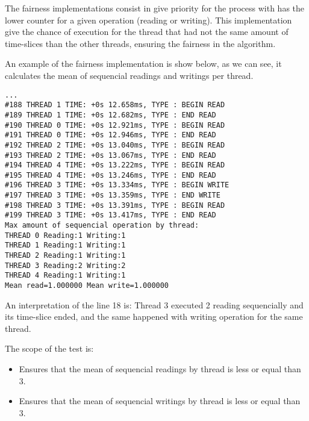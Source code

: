 \documentclass{article}
\begin{document}
	The fairness implementations consist in give priority for the process with has 
	the lower counter for a given operation (reading or writing). This implementation 
	give the chance of execution for the thread that had not the same amount of time-slices than 
	the other threads, ensuring the fairness in the algorithm.
	
	An example of the fairness implementation is show below, as we can see, it calculates
	the mean of sequencial readings and writings per thread. 

\begin{lstlisting}
...
#188 THREAD 1 TIME: +0s 12.658ms, TYPE : BEGIN READ 
#189 THREAD 1 TIME: +0s 12.682ms, TYPE : END READ 
#190 THREAD 0 TIME: +0s 12.921ms, TYPE : BEGIN READ 
#191 THREAD 0 TIME: +0s 12.946ms, TYPE : END READ 
#192 THREAD 2 TIME: +0s 13.040ms, TYPE : BEGIN READ 
#193 THREAD 2 TIME: +0s 13.067ms, TYPE : END READ 
#194 THREAD 4 TIME: +0s 13.222ms, TYPE : BEGIN READ 
#195 THREAD 4 TIME: +0s 13.246ms, TYPE : END READ 
#196 THREAD 3 TIME: +0s 13.334ms, TYPE : BEGIN WRITE 
#197 THREAD 3 TIME: +0s 13.359ms, TYPE : END WRITE 
#198 THREAD 3 TIME: +0s 13.391ms, TYPE : BEGIN READ 
#199 THREAD 3 TIME: +0s 13.417ms, TYPE : END READ 
Max amount of sequencial operation by thread:
THREAD 0 Reading:1 Writing:1
THREAD 1 Reading:1 Writing:1
THREAD 2 Reading:1 Writing:1
THREAD 3 Reading:2 Writing:2
THREAD 4 Reading:1 Writing:1
Mean read=1.000000 Mean write=1.000000
\end{lstlisting}

		An interpretation of the line 18 is: Thread 3 executed 2 reading sequencially and 
		its time-slice ended, and the same happened with writing operation for the same thread.
		
		The scope of the test is:
		\begin{itemize}
		\item Ensures that the mean of sequencial readings by thread is less or equal than 3.
		\item Ensures that the mean of sequencial writings by thread is less or equal than 3.
		\end{itemize}
\end{document}
